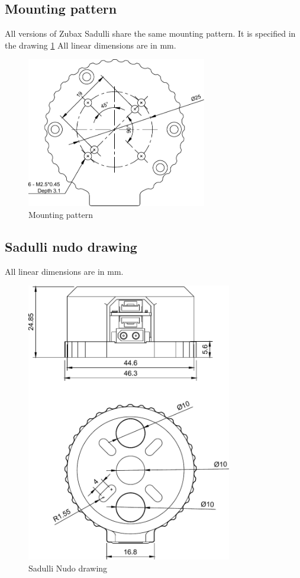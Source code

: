 \documentclass{document_templates/documentation_template_latex/zubaxdoc}
\begin{document}
\subsection{Mounting pattern}

All versions of Zubax Sadulli share the same mounting pattern. It is specified in the drawing \ref{mounting_pattern} All linear dimensions are in mm.

\begin{figure}[!hbt]
	\centerline{\includegraphics[width=0.7\textwidth]{figures/mounting_pattern}}
	\caption{Mounting pattern\label{mounting_pattern}}
\end{figure}

\newpage

\subsection{Sadulli nudo drawing}
All linear dimensions are in mm.

\begin{figure}[!hbt]
	\centerline{\includegraphics[width=0.8\textwidth]{figures/sadulli_nudo}}
	\caption{Sadulli Nudo drawing\label{Nudo_drawing}}
\end{figure}
\end{document}
